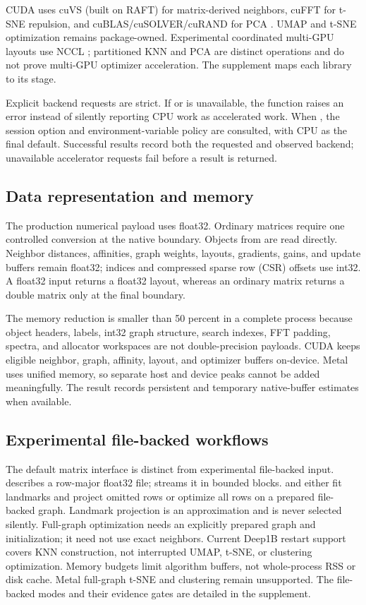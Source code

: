 \documentclass[article]{jss}
\begin{document}
CUDA uses cuVS (built on RAFT) for matrix-derived neighbors, cuFFT for t-SNE
repulsion, and cuBLAS/cuSOLVER/cuRAND for PCA \citep{nvidiaCUVS2026}.
UMAP and t-SNE optimization remains package-owned. Experimental
coordinated multi-GPU layouts use NCCL \citep{nvidiaNCCL2026}; partitioned
KNN and PCA are distinct operations and do not prove multi-GPU optimizer
acceleration. The supplement maps each library to its stage.

Explicit backend requests are strict. If  or
 is unavailable, the function raises an error instead
of silently reporting CPU work as accelerated work. When ,
the session option and environment-variable policy are consulted, with CPU as
the final default. Successful results record both the requested and observed
backend; unavailable accelerator requests fail before a result is returned.

\subsection{Data representation and memory}

The production numerical payload uses float32. Ordinary  matrices
require one controlled conversion at the native boundary. Objects from
 are read directly. Neighbor distances, affinities, graph weights,
layouts, gradients, gains, and update buffers remain float32; indices and
compressed sparse row (CSR) offsets use int32. A float32 input returns a
float32 layout, whereas an ordinary matrix returns a double matrix only at the
final  boundary.

The memory reduction is smaller than 50 percent in a complete process because
object headers, labels, int32 graph structure, search indexes, FFT padding,
spectra, and allocator workspaces are not double-precision payloads. CUDA keeps
eligible neighbor, graph, affinity, layout, and optimizer buffers on-device.
Metal uses unified memory, so separate host and device peaks cannot be added
meaningfully. The result records persistent and temporary native-buffer
estimates when available.

\subsection{Experimental file-backed workflows}

The default matrix interface is distinct from experimental file-backed
input.  describes a row-major float32 file;
 streams it in bounded blocks.  and 
either fit landmarks and project omitted rows or optimize all rows on a
prepared file-backed graph. Landmark projection is an approximation and is
never selected silently. Full-graph optimization needs an explicitly
prepared graph and initialization; it need not use exact neighbors.
Current Deep1B restart support covers KNN construction, not interrupted
UMAP, t-SNE, or clustering optimization. Memory budgets limit algorithm
buffers, not whole-process RSS or disk cache. Metal full-graph t-SNE and
clustering remain unsupported. The file-backed modes and their evidence
gates are detailed in the supplement.
\end{document}
